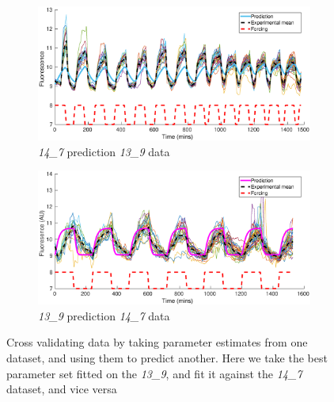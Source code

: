 \documentclass[10pt,journal]{./IEEE_latex_class/IEEEtran}
\begin{document}
\begin{figure}[h]	
	\begin{subfigure}[h]{0.49\textwidth}
    \centering
        \includegraphics[scale = 0.26]{14_7_pred_13_9_data}
        \caption{\textit{14\_7} prediction \textit{13\_9} data}
        \label{SensitivityMatrix_unscaled} 
    \end{subfigure}
    \begin{subfigure}[h]{0.49\textwidth}
    \centering
        \includegraphics[scale = 0.26]{13_9_pred_14_7_data}
        \caption{\textit{13\_9} prediction \textit{14\_7} data}
                \label{SensitivityMatrix_scaled} 
    \end{subfigure}
    \caption{Cross validating data by taking parameter estimates from one dataset, and using them to predict another. Here we take the best parameter set fitted on the \textit{13\_9}, and fit it against the \textit{14\_7} dataset, and vice versa } 
\label{CrossValidation}   
\end{figure}
\end{document}
